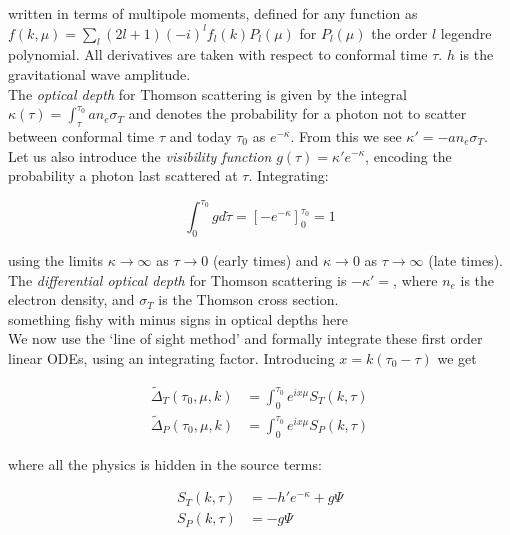 \documentclass[a4paper,10pt]{article}
\begin{document}
written in terms of multipole moments, defined for any function as $f(k, \mu) = \sum_l (2l+1)(-i)^lf_l(k)P_l(\mu)$ for $P_l(\mu)$ the order $l$ legendre polynomial. All derivatives are taken with respect to conformal time $\tau$. $h$ is the gravitational wave amplitude.\\

The \textit{optical depth} for Thomson scattering is given by the integral $\kappa(\tau) = \int_\tau^{\tau_0} an_e\sigma_T$ and denotes the probability for a photon not to scatter between conformal time $\tau$ and today $\tau_0$ as $e^{-\kappa}$. From this we see $\kappa'=-an_e\sigma_T$. Let us also introduce the \textit{visibility function} $g(\tau) = \kappa'e^{-\kappa}$, encoding the probability a photon last scattered at $\tau$. Integrating:

\begin{equation}
\int_0^{\tau_0} g d\tilde{\tau} = [-e^{-\kappa}]_0^{\tau_0} = 1
\end{equation}

using the limits $\kappa \rightarrow \infty$ as $\tau\rightarrow0$ (early times) and $\kappa \rightarrow 0$ as $\tau\rightarrow \infty$ (late times).\\




 The \textit{differential optical depth} for Thomson scattering is $-\kappa'=$, where $n_e$ is the electron density, and $\sigma_T$ is the Thomson cross section.  \\
something fishy with minus signs in optical depths here\\






We now use the `line of sight method' and formally integrate these first order linear ODEs, using an integrating factor. Introducing $x=k(\tau_0-\tau)$ we get  

\begin{equation}\begin{split}
\tilde{\Delta}_T(\tau_0,\mu,k) &= \int_0^{\tau_0} e^{ix\mu}S_T(k,\tau)\\
\tilde{\Delta}_P(\tau_0,\mu,k) &= \int_0^{\tau_0} e^{ix\mu}S_P(k,\tau)
\end{split}\end{equation}

where all the physics is hidden in the source terms:

\begin{equation}\begin{split}
S_T(k,\tau) &= -h'e^{-\kappa}+g\Psi\\
S_P(k,\tau) &= -g\Psi
\end{split}\end{equation}
\end{document}
